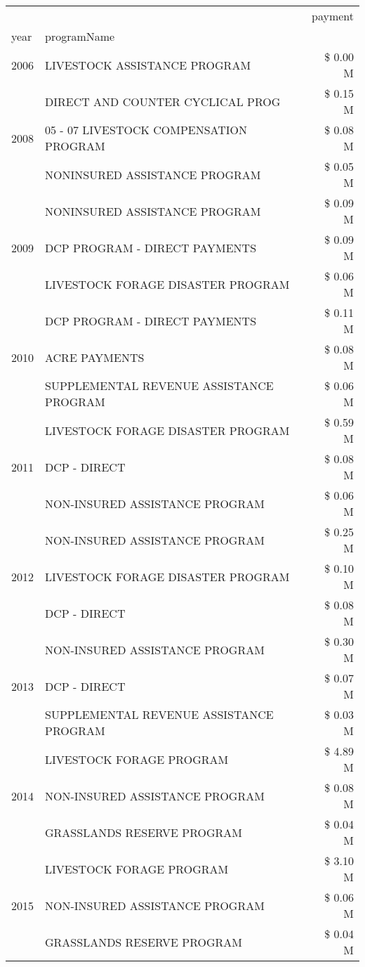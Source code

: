 \begin{tabular}{llr}
\toprule
 &  & payment \\
year & programName &  \\
\midrule
2006 & LIVESTOCK ASSISTANCE PROGRAM & \$ 0.00 M \\
\cline{1-3}
\multirow[t]{3}{*}{2008} & DIRECT AND COUNTER CYCLICAL PROG & \$ 0.15 M \\
 & 05 - 07 LIVESTOCK COMPENSATION PROGRAM & \$ 0.08 M \\
 & NONINSURED ASSISTANCE PROGRAM & \$ 0.05 M \\
\cline{1-3}
\multirow[t]{3}{*}{2009} & NONINSURED ASSISTANCE PROGRAM & \$ 0.09 M \\
 & DCP PROGRAM - DIRECT PAYMENTS & \$ 0.09 M \\
 & LIVESTOCK FORAGE DISASTER  PROGRAM & \$ 0.06 M \\
\cline{1-3}
\multirow[t]{3}{*}{2010} & DCP PROGRAM - DIRECT PAYMENTS & \$ 0.11 M \\
 & ACRE PAYMENTS & \$ 0.08 M \\
 & SUPPLEMENTAL REVENUE ASSISTANCE PROGRAM & \$ 0.06 M \\
\cline{1-3}
\multirow[t]{3}{*}{2011} & LIVESTOCK FORAGE DISASTER PROGRAM & \$ 0.59 M \\
 & DCP - DIRECT & \$ 0.08 M \\
 & NON-INSURED ASSISTANCE PROGRAM & \$ 0.06 M \\
\cline{1-3}
\multirow[t]{3}{*}{2012} & NON-INSURED ASSISTANCE PROGRAM & \$ 0.25 M \\
 & LIVESTOCK FORAGE DISASTER PROGRAM & \$ 0.10 M \\
 & DCP - DIRECT & \$ 0.08 M \\
\cline{1-3}
\multirow[t]{3}{*}{2013} & NON-INSURED ASSISTANCE PROGRAM & \$ 0.30 M \\
 & DCP - DIRECT & \$ 0.07 M \\
 & SUPPLEMENTAL REVENUE ASSISTANCE PROGRAM & \$ 0.03 M \\
\cline{1-3}
\multirow[t]{3}{*}{2014} & LIVESTOCK FORAGE PROGRAM & \$ 4.89 M \\
 & NON-INSURED ASSISTANCE PROGRAM & \$ 0.08 M \\
 & GRASSLANDS RESERVE PROGRAM & \$ 0.04 M \\
\cline{1-3}
\multirow[t]{3}{*}{2015} & LIVESTOCK FORAGE PROGRAM & \$ 3.10 M \\
 & NON-INSURED ASSISTANCE PROGRAM & \$ 0.06 M \\
 & GRASSLANDS RESERVE PROGRAM & \$ 0.04 M \\

\end{tabular}
